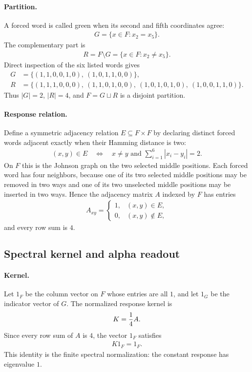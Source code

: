 \paragraph{Partition.}
A forced word is called green when its second and fifth coordinates agree:
$$\begin{aligned}
G=\{x\in F : x_2=x_5\} .
\end{aligned}$$
The complementary part is
$$\begin{aligned}
R=F\setminus G=\{x\in F : x_2\ne x_5\} .
\end{aligned}$$
Direct inspection of the six listed words gives
$$\begin{aligned}
G&=\{(1,1,0,0,1,0),\ (1,0,1,1,0,0)\},\\
R&=\{(1,1,1,0,0,0),\ (1,1,0,1,0,0),\ (1,0,1,0,1,0),\ (1,0,0,1,1,0)\}.
\end{aligned}$$
Thus $|G|=2$, $|R|=4$, and $F=G\sqcup R$ is a disjoint partition.

\paragraph{Response relation.}
Define a symmetric adjacency relation $E\subseteq F\times F$ by declaring distinct forced words adjacent exactly when their Hamming distance is two:
$$\begin{aligned}
(x,y)\in E \quad\Longleftrightarrow\quad x\ne y\text{ and }\sum_{i=1}^6 |x_i-y_i|=2 .
\end{aligned}$$
On $F$ this is the Johnson graph on the two selected middle positions.  Each forced word has four neighbors, because one of its two selected middle positions may be removed in two ways and one of its two unselected middle positions may be inserted in two ways.  Hence the adjacency matrix $A$ indexed by $F$ has entries
$$\begin{aligned}
A_{xy}=\begin{cases}1,&(x,y)\in E,\\0,&(x,y)\notin E,\end{cases}
\end{aligned}$$
and every row sum is $4$.

\subsection{Spectral kernel and alpha readout}\label{sec:window6-green-spectral-kernel}

\paragraph{Kernel.}
Let $1_F$ be the column vector on $F$ whose entries are all $1$, and let $1_G$ be the indicator vector of $G$.  The normalized response kernel is
$$\begin{aligned}
K={1\over 4}A .
\end{aligned}$$
Since every row sum of $A$ is $4$, the vector $1_F$ satisfies
$$\begin{aligned}
K1_F=1_F .
\end{aligned}$$
This identity is the finite spectral normalization: the constant response has eigenvalue $1$.

